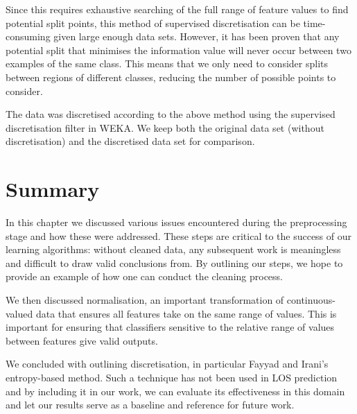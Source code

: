 Since this requires exhaustive searching of the full range of feature values
to find potential split points, this method of supervised discretisation can
be time-consuming given large enough data sets. However, it has been proven
that any potential split that minimises the information value will never occur
between two examples of the same class. This means that we only need to
consider splits between regions of different classes, reducing the number of
possible points to consider.

The data was discretised according to the above method using the supervised
discretisation filter in WEKA. We keep both the original data set (without
discretisation) and the discretised data set for comparison.

\section{Summary}
In this chapter we discussed various issues encountered during the
preprocessing stage and how these were addressed. These steps are critical to
the success of our learning algorithms: without cleaned data, any subsequent
work is meaningless and difficult to draw valid conclusions from. By outlining
our steps, we hope to provide an example of how one can conduct the cleaning
process.

We then discussed normalisation, an important transformation of
continuous-valued data that ensures all features take on the same range of
values. This is important for ensuring that classifiers sensitive to the
relative range of values between features give valid outputs.

We concluded with outlining discretisation, in particular Fayyad and Irani's
entropy-based method. Such a technique has not been used in LOS prediction
and by including it in our work, we can evaluate its effectiveness in this
domain and let our results serve
as a baseline and reference for future work.
